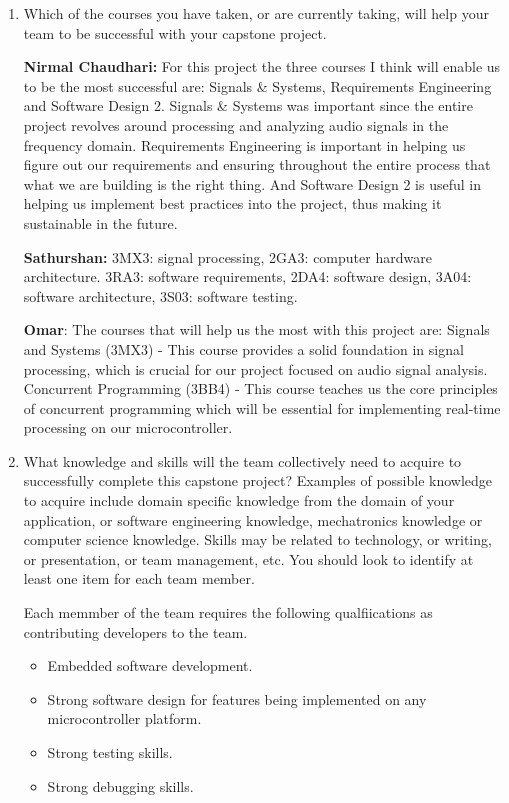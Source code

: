 \begin{enumerate}
  
  \item Which of the courses you have taken, or are currently taking, will help
  your team to be successful with your capstone project.

  \textbf{Nirmal Chaudhari: } For this project the three courses I think will 
  enable us to be the most successful are: Signals \& Systems, Requirements 
  Engineering and Software Design 2. Signals \& Systems was important since the 
  entire project revolves around processing and analyzing audio signals in the 
  frequency domain. Requirements Engineering is important in helping us figure 
  out our requirements and ensuring throughout the entire process that what we 
  are building is the right thing. And Software Design 2 is useful in helping 
  us implement best practices into the project, thus making it sustainable 
  in the future.

  \textbf{Sathurshan:} 3MX3: signal processing, 2GA3: computer hardware
  architecture. 3RA3: software requirements, 2DA4: software design,
  3A04: software architecture, 3S03: software testing.

  \textbf{Omar}: The courses that will help us the most with this project are:
  Signals and Systems (3MX3) - This course provides a solid foundation in signal
  processing, which is crucial for our project focused on audio signal analysis.
  Concurrent Programming (3BB4) - This course teaches us the core principles
  of concurrent programming which will be essential for implementing real-time
  processing on our microcontroller.

  \item What knowledge and skills will the team collectively need to acquire to
  successfully complete this capstone project?  Examples of possible knowledge
  to acquire include domain specific knowledge from the domain of your
  application, or software engineering knowledge, mechatronics knowledge or
  computer science knowledge.  Skills may be related to technology, or writing,
  or presentation, or team management, etc.  You should look to identify at
  least one item for each team member.

  Each memmber of the team requires the following qualfiications as contributing
  developers to the team.

  \begin{itemize}
    \item Embedded software development.
    \item Strong software design for features being implemented on any 
    microcontroller platform. 
    \item Strong testing skills.
    \item Strong debugging skills. 
  \end{itemize}


\end{enumerate}
